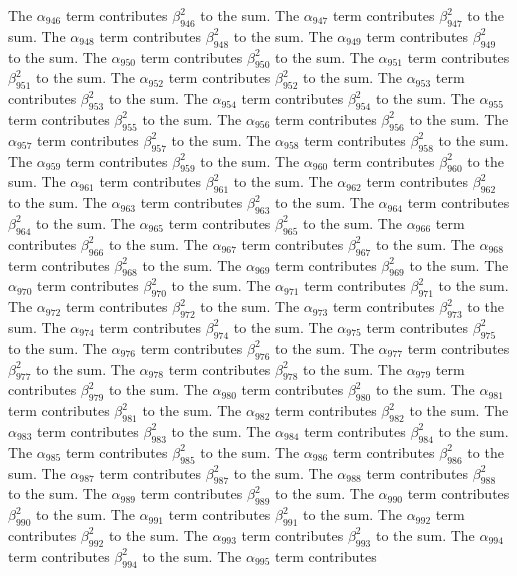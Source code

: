 \begin{lemma}
The $\alpha_{946}$ term contributes $\beta_{946}^{2}$ to the sum. The $\alpha_{947}$ term contributes $\beta_{947}^{2}$ to the sum. The $\alpha_{948}$ term contributes $\beta_{948}^{2}$ to the sum. The $\alpha_{949}$ term contributes $\beta_{949}^{2}$ to the sum. The $\alpha_{950}$ term contributes $\beta_{950}^{2}$ to the sum. The $\alpha_{951}$ term contributes $\beta_{951}^{2}$ to the sum. The $\alpha_{952}$ term contributes $\beta_{952}^{2}$ to the sum. The $\alpha_{953}$ term contributes $\beta_{953}^{2}$ to the sum. The $\alpha_{954}$ term contributes $\beta_{954}^{2}$ to the sum. The $\alpha_{955}$ term contributes $\beta_{955}^{2}$ to the sum. The $\alpha_{956}$ term contributes $\beta_{956}^{2}$ to the sum. The $\alpha_{957}$ term contributes $\beta_{957}^{2}$ to the sum. The $\alpha_{958}$ term contributes $\beta_{958}^{2}$ to the sum. The $\alpha_{959}$ term contributes $\beta_{959}^{2}$ to the sum. The $\alpha_{960}$ term contributes $\beta_{960}^{2}$ to the sum. The $\alpha_{961}$ term contributes $\beta_{961}^{2}$ to the sum. The $\alpha_{962}$ term contributes $\beta_{962}^{2}$ to the sum. The $\alpha_{963}$ term contributes $\beta_{963}^{2}$ to the sum. The $\alpha_{964}$ term contributes $\beta_{964}^{2}$ to the sum. The $\alpha_{965}$ term contributes $\beta_{965}^{2}$ to the sum. The $\alpha_{966}$ term contributes $\beta_{966}^{2}$ to the sum. The $\alpha_{967}$ term contributes $\beta_{967}^{2}$ to the sum. The $\alpha_{968}$ term contributes $\beta_{968}^{2}$ to the sum. The $\alpha_{969}$ term contributes $\beta_{969}^{2}$ to the sum. The $\alpha_{970}$ term contributes $\beta_{970}^{2}$ to the sum. The $\alpha_{971}$ term contributes $\beta_{971}^{2}$ to the sum. The $\alpha_{972}$ term contributes $\beta_{972}^{2}$ to the sum. The $\alpha_{973}$ term contributes $\beta_{973}^{2}$ to the sum. The $\alpha_{974}$ term contributes $\beta_{974}^{2}$ to the sum. The $\alpha_{975}$ term contributes $\beta_{975}^{2}$ to the sum. The $\alpha_{976}$ term contributes $\beta_{976}^{2}$ to the sum. The $\alpha_{977}$ term contributes $\beta_{977}^{2}$ to the sum. The $\alpha_{978}$ term contributes $\beta_{978}^{2}$ to the sum. The $\alpha_{979}$ term contributes $\beta_{979}^{2}$ to the sum. The $\alpha_{980}$ term contributes $\beta_{980}^{2}$ to the sum. The $\alpha_{981}$ term contributes $\beta_{981}^{2}$ to the sum. The $\alpha_{982}$ term contributes $\beta_{982}^{2}$ to the sum. The $\alpha_{983}$ term contributes $\beta_{983}^{2}$ to the sum. The $\alpha_{984}$ term contributes $\beta_{984}^{2}$ to the sum. The $\alpha_{985}$ term contributes $\beta_{985}^{2}$ to the sum. The $\alpha_{986}$ term contributes $\beta_{986}^{2}$ to the sum. The $\alpha_{987}$ term contributes $\beta_{987}^{2}$ to the sum. The $\alpha_{988}$ term contributes $\beta_{988}^{2}$ to the sum. The $\alpha_{989}$ term contributes $\beta_{989}^{2}$ to the sum. The $\alpha_{990}$ term contributes $\beta_{990}^{2}$ to the sum. The $\alpha_{991}$ term contributes $\beta_{991}^{2}$ to the sum. The $\alpha_{992}$ term contributes $\beta_{992}^{2}$ to the sum. The $\alpha_{993}$ term contributes $\beta_{993}^{2}$ to the sum. The $\alpha_{994}$ term contributes $\beta_{994}^{2}$ to the sum. The $\alpha_{995}$ term contributes 
\end{lemma}
